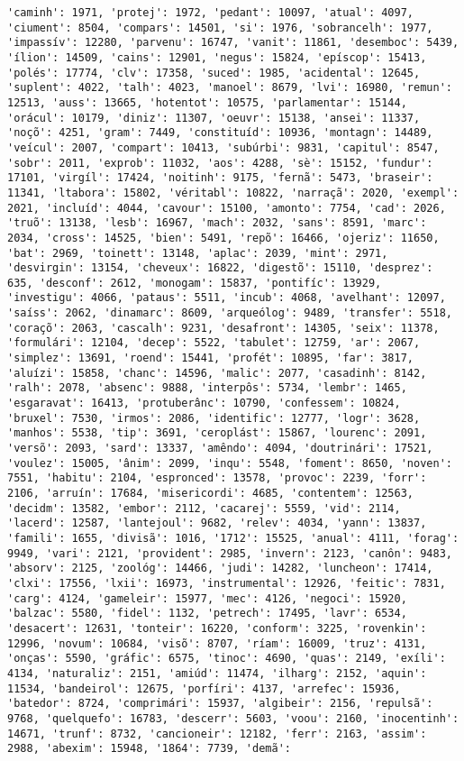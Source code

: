 \begin{Verbatim}[commandchars=\\\{\}]
'caminh': 1971, 'protej': 1972, 'pedant': 10097, 'atual': 4097, 'ciument': 8504, 'compars': 14501, 'si': 1976, 'sobrancelh': 1977, 'impassív': 12280, 'parvenu': 16747, 'vanit': 11861, 'desemboc': 5439, 'ílion': 14509, 'cains': 12901, 'negus': 15824, 'epíscop': 15413, 'polés': 17774, 'clv': 17358, 'suced': 1985, 'acidental': 12645, 'suplent': 4022, 'talh': 4023, 'manoel': 8679, 'lvi': 16980, 'remun': 12513, 'auss': 13665, 'hotentot': 10575, 'parlamentar': 15144, 'orácul': 10179, 'diniz': 11307, 'oeuvr': 15138, 'ansei': 11337, 'noçõ': 4251, 'gram': 7449, 'constituíd': 10936, 'montagn': 14489, 'veícul': 2007, 'compart': 10413, 'subúrbi': 9831, 'capitul': 8547, 'sobr': 2011, 'exprob': 11032, 'aos': 4288, 'sè': 15152, 'fundur': 17101, 'virgíl': 17424, 'noitinh': 9175, 'fernã': 5473, 'braseir': 11341, 'ltabora': 15802, 'véritabl': 10822, 'narraçã': 2020, 'exempl': 2021, 'incluíd': 4044, 'cavour': 15100, 'amonto': 7754, 'cad': 2026, 'truõ': 13138, 'lesb': 16967, 'mach': 2032, 'sans': 8591, 'marc': 2034, 'cross': 14525, 'bien': 5491, 'repõ': 16466, 'ojeriz': 11650, 'bat': 2969, 'toinett': 13148, 'aplac': 2039, 'mint': 2971, 'desvirgin': 13154, 'cheveux': 16822, 'digestõ': 15110, 'desprez': 635, 'desconf': 2612, 'monogam': 15837, 'pontifíc': 13929, 'investigu': 4066, 'pataus': 5511, 'incub': 4068, 'avelhant': 12097, 'saíss': 2062, 'dinamarc': 8609, 'arqueólog': 9489, 'transfer': 5518, 'coraçõ': 2063, 'cascalh': 9231, 'desafront': 14305, 'seix': 11378, 'formulári': 12104, 'decep': 5522, 'tabulet': 12759, 'ar': 2067, 'simplez': 13691, 'roend': 15441, 'profét': 10895, 'far': 3817, 'aluízi': 15858, 'chanc': 14596, 'malic': 2077, 'casadinh': 8142, 'ralh': 2078, 'absenc': 9888, 'interpôs': 5734, 'lembr': 1465, 'esgaravat': 16413, 'protuberânc': 10790, 'confessem': 10824, 'bruxel': 7530, 'irmos': 2086, 'identific': 12777, 'logr': 3628, 'manhos': 5538, 'tip': 3691, 'ceroplást': 15867, 'lourenc': 2091, 'versõ': 2093, 'sard': 13337, 'amêndo': 4094, 'doutrinári': 17521, 'voulez': 15005, 'ânim': 2099, 'inqu': 5548, 'foment': 8650, 'noven': 7551, 'habitu': 2104, 'espronced': 13578, 'provoc': 2239, 'forr': 2106, 'arruín': 17684, 'misericordi': 4685, 'contentem': 12563, 'decidm': 13582, 'embor': 2112, 'cacarej': 5559, 'vid': 2114, 'lacerd': 12587, 'lantejoul': 9682, 'relev': 4034, 'yann': 13837, 'famili': 1655, 'divisã': 1016, '1712': 15525, 'anual': 4111, 'forag': 9949, 'vari': 2121, 'provident': 2985, 'invern': 2123, 'canôn': 9483, 'absorv': 2125, 'zoológ': 14466, 'judi': 14282, 'luncheon': 17414, 'clxi': 17556, 'lxii': 16973, 'instrumental': 12926, 'feitic': 7831, 'carg': 4124, 'gameleir': 15977, 'mec': 4126, 'negoci': 15920, 'balzac': 5580, 'fidel': 1132, 'petrech': 17495, 'lavr': 6534, 'desacert': 12631, 'tonteir': 16220, 'conform': 3225, 'rovenkin': 12996, 'novum': 10684, 'visõ': 8707, 'ríam': 16009, 'truz': 4131, 'onças': 5590, 'gráfic': 6575, 'tinoc': 4690, 'quas': 2149, 'exíli': 4134, 'naturaliz': 2151, 'amiúd': 11474, 'ilharg': 2152, 'aquin': 11534, 'bandeirol': 12675, 'porfíri': 4137, 'arrefec': 15936, 'batedor': 8724, 'comprimári': 15937, 'algibeir': 2156, 'repulsã': 9768, 'quelquefo': 16783, 'descerr': 5603, 'voou': 2160, 'inocentinh': 14671, 'trunf': 8732, 'cancioneir': 12182, 'ferr': 2163, 'assim': 2988, 'abexim': 15948, '1864': 7739, 'demã': 
\end{Verbatim}
